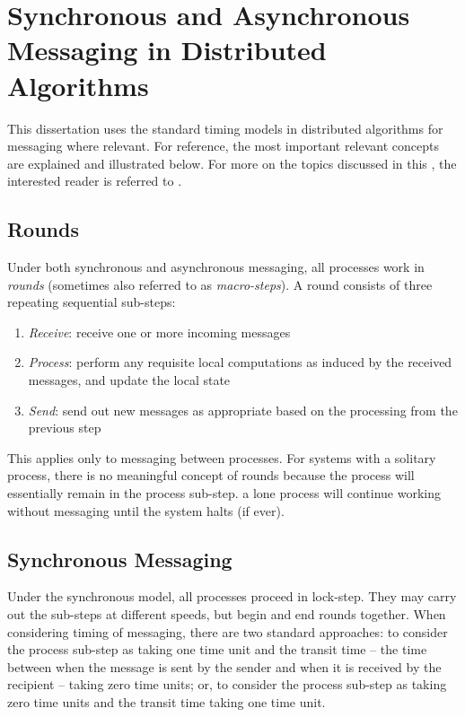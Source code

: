 \section{\label{sec:back:syncasync}Synchronous and Asynchronous Messaging in Distributed Algorithms}

This dissertation uses the standard timing models in distributed algorithms \cite{Lynch1996} for messaging where relevant.  For reference, the most important relevant concepts are explained and illustrated below.  For more on the topics discussed in this , the interested reader is referred to \cite{Fokkink2013,Lynch1996,Tel2000}.

\subsection{Rounds}
Under both synchronous and asynchronous messaging, all processes work in \emph{rounds} (sometimes also referred to as \emph{macro-steps}).  A round consists of three repeating sequential sub-steps:
\begin{enumerate}
    \item \emph{\textsf{Receive}}:  receive one or more incoming messages
    \item \emph{\textsf{Process}}:  perform any requisite local computations as induced by the received messages, and update the local state
    \item \emph{\textsf{Send}}:  send out new messages as appropriate based on the processing from the previous step
\end{enumerate}
This applies only to messaging between processes.  For systems with a solitary process, there is no meaningful concept of rounds because the process will essentially remain in the \textsf{process} sub-step.  \Ie{} a lone process will continue working without messaging until the system halts (if ever).

\subsection{Synchronous Messaging}
Under the synchronous model, all processes proceed in lock-step.  They may carry out the sub-steps at different speeds, but begin and end rounds together.  When considering timing of messaging, there are two standard approaches:  to consider the \textsf{process} sub-step as taking one time unit and the transit time -- the time between when the message is sent by the sender and when it is received by the recipient -- taking zero time units; or, to consider the \textsf{process} sub-step as taking zero time units and the transit time taking one time unit.


